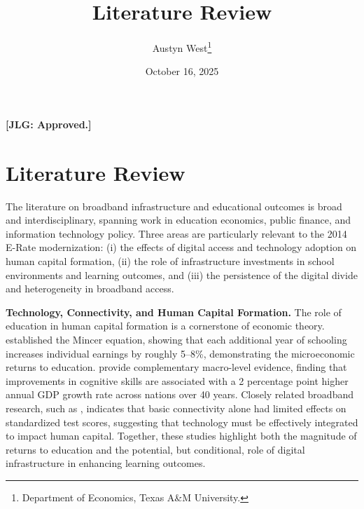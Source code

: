 


\begin{singlespace}
\title{Literature Review}
\author{Austyn West\thanks{Department of Economics, Texas A\&M University.}}
\date{October 16, 2025}
\maketitle
\end{singlespace}


\noindent \textbf{[JLG: Approved.]}

\section*{Literature Review}

The literature on broadband infrastructure and educational outcomes is broad and interdisciplinary, spanning work in education economics, public finance, and information technology policy. Three areas are particularly relevant to the 2014 E-Rate modernization: (i) the effects of digital access and technology adoption on human capital formation, (ii) the role of infrastructure investments in school environments and learning outcomes, and (iii) the persistence of the digital divide and heterogeneity in broadband access.

\textbf{Technology, Connectivity, and Human Capital Formation.} The role of education in human capital formation is a cornerstone of economic theory. \citet{mincer1974} established the Mincer equation, showing that each additional year of schooling increases individual earnings by roughly 5–8\%, demonstrating the microeconomic returns to education. \citet{hanushek2012} provide complementary macro-level evidence, finding that improvements in cognitive skills are associated with a 2 percentage point higher annual GDP growth rate across nations over 40 years. Closely related broadband research, such as \citet{hazlett2019}, indicates that basic connectivity alone had limited effects on standardized test scores, suggesting that technology must be effectively integrated to impact human capital. Together, these studies highlight both the magnitude of returns to education and the potential, but conditional, role of digital infrastructure in enhancing learning outcomes.

